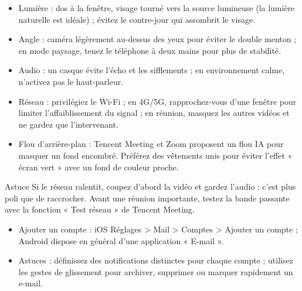 
\begin{itemize}
  \item Lumière : dos à la fenêtre, visage tourné vers la source lumineuse (la lumière naturelle est idéale) ; évitez le contre-jour qui assombrit le visage.
  \item Angle : caméra légèrement au-dessus des yeux pour éviter le double menton ; en mode paysage, tenez le téléphone à deux mains pour plus de stabilité.
  \item Audio : un casque évite l'écho et les sifflements ; en environnement calme, n'activez pas le haut-parleur.
  \item Réseau : privilégiez le Wi-Fi ; en 4G/5G, rapprochez-vous d'une fenêtre pour limiter l'affaiblissement du signal ; en réunion, masquez les autres vidéos et ne gardez que l'intervenant.
  \item Flou d'arrière-plan : Tencent Meeting et Zoom proposent un flou IA pour masquer un fond encombré. Préférez des vêtements unis pour éviter l'effet « écran vert » avec un fond de couleur proche.
\end{itemize}

\begin{tcbinfo}{Astuce}
Si le réseau ralentit, coupez d'abord la vidéo et gardez l'audio : c'est plus poli que de raccrocher. Avant une réunion importante, testez la bande passante avec la fonction « Test réseau » de Tencent Meeting.

\end{tcbinfo}


\begin{itemize}
  \item Ajouter un compte : iOS Réglages > Mail > Comptes > Ajouter un compte ; Android dispose en général d'une application « E-mail ».
  \item Astuces : définissez des notifications distinctes pour chaque compte ; utilisez les gestes de glissement pour archiver, supprimer ou marquer rapidement un e-mail.
\end{itemize}


